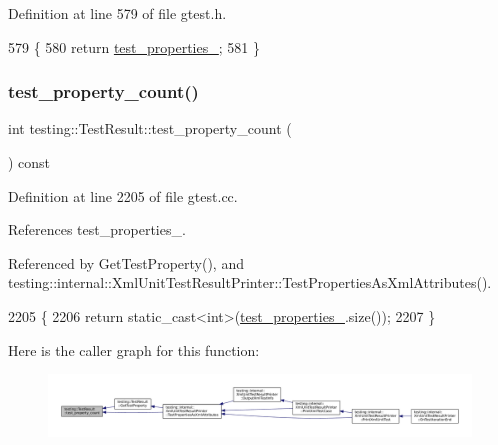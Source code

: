 Definition at line 579 of file gtest.\+h.


\begin{DoxyCode}
579                                                          \{
580     \textcolor{keywordflow}{return} \hyperlink{classtesting_1_1TestResult_a29cde491988faff4ef2d9f9b6c13d9fa}{test\_properties\_};
581   \}
\end{DoxyCode}
\mbox{\label{classtesting_1_1TestResult_afe4523257bbea8bc63b0950b702790be}} 
\subsubsection{\texorpdfstring{test\+\_\+property\+\_\+count()}{test\_property\_count()}}
{\footnotesize\ttfamily int testing\+::\+Test\+Result\+::test\+\_\+property\+\_\+count (\begin{DoxyParamCaption}{ }\end{DoxyParamCaption}) const}



Definition at line 2205 of file gtest.\+cc.



References test\+\_\+properties\+\_\+.



Referenced by Get\+Test\+Property(), and testing\+::internal\+::\+Xml\+Unit\+Test\+Result\+Printer\+::\+Test\+Properties\+As\+Xml\+Attributes().


\begin{DoxyCode}
2205                                           \{
2206   \textcolor{keywordflow}{return} \textcolor{keyword}{static\_cast<}\textcolor{keywordtype}{int}\textcolor{keyword}{>}(\hyperlink{classtesting_1_1TestResult_a29cde491988faff4ef2d9f9b6c13d9fa}{test\_properties\_}.size());
2207 \}
\end{DoxyCode}
Here is the caller graph for this function\+:
\nopagebreak
\begin{figure}[H]
\begin{center}
\leavevmode
\includegraphics[width=350pt]{classtesting_1_1TestResult_afe4523257bbea8bc63b0950b702790be_icgraph}
\end{center}
\end{figure}
\mbox{\label{classtesting_1_1TestResult_a6174aa4019dcda7c34d776b5741c9032}} 

